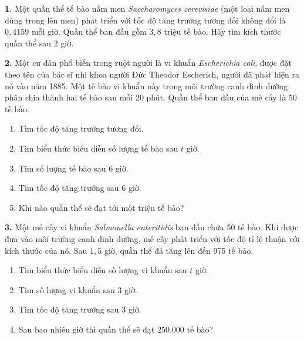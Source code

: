 \noindent
{}

\vspace{10pt}

\noindent
\begin{minipage}[t]{0.485\textwidth}
\raggedright

\textbf{1.} Một quần thể tế bào nấm men \textit{Saccharomyces cerevisiae} (một loại nấm men dùng trong lên men) phát triển với tốc độ tăng trưởng tương đối không đổi là $0{,}4159$ mỗi giờ. Quần thể ban đầu gồm $3{,}8$ triệu tế bào. Hãy tìm kích thước quần thể sau 2 giờ.

\vspace{8pt}
\textbf{2.} Một cư dân phổ biến trong ruột người là vi khuẩn \textit{Escherichia coli}, được đặt theo tên của bác sĩ nhi khoa người Đức Theodor Escherich, người đã phát hiện ra nó vào năm 1885. Một tế bào vi khuẩn này trong môi trường canh dinh dưỡng phân chia thành hai tế bào sau mỗi 20 phút. Quần thể ban đầu của mẻ cấy là 50 tế bào.
\begin{enumerate}[label=(\alph*), leftmargin=16pt, itemsep=2pt, topsep=3pt]
    \item Tìm tốc độ tăng trưởng tương đối.
    \item Tìm biểu thức biểu diễn số lượng tế bào sau $t$ giờ.
    \item Tìm số lượng tế bào sau 6 giờ.
    \item Tìm tốc độ tăng trưởng sau 6 giờ.
    \item Khi nào quần thể sẽ đạt tới một triệu tế bào?
\end{enumerate}

\vspace{8pt}
\textbf{3.} Một mẻ cấy vi khuẩn \textit{Salmonella enteritidis} ban đầu chứa 50 tế bào. Khi được đưa vào môi trường canh dinh dưỡng, mẻ cấy phát triển với tốc độ tỉ lệ thuận với kích thước của nó. Sau $1{,}5$ giờ, quần thể đã tăng lên đến 975 tế bào.
\begin{enumerate}[label=(\alph*), leftmargin=16pt, itemsep=2pt, topsep=3pt]
    \item Tìm biểu thức biểu diễn số lượng vi khuẩn sau $t$ giờ.
    \item Tìm số lượng vi khuẩn sau 3 giờ.
    \item Tìm tốc độ tăng trưởng sau 3 giờ.
    \item Sau bao nhiêu giờ thì quần thể sẽ đạt 250.000 tế bào?
\end{enumerate}


\end{minipage}
